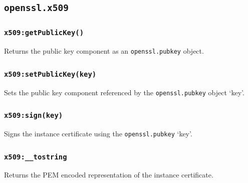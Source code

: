 \documentclass[11pt, oneside]{memoir}
\newcommand*{\fn}[1]{\texttt{#1}\xspace}
\newcommand*{\module}[1]{\texttt{#1}\xspace}
\newcounter{toccols}
\newenvironment{Module}[1]{
	\subsection{\texttt{#1}}
	\addtocontents{toc}{
		\protect\begin{multicols}{\value{toccols}}
	}
}{
	\addtocontents{toc}{\protect\end{multicols}}
}
\begin{document}
\begin{Module}{openssl.x509}
\subsubsection[\fn{x509:getPublicKey}]{\fn{x509:getPublicKey()}}

Returns the public key component as an \module{openssl.pubkey} object.

\subsubsection[\fn{x509:setPublicKey}]{\fn{x509:setPublicKey(key)}}

Sets the public key component referenced by the \module{openssl.pubkey} object `key'.

\subsubsection[\fn{x509:sign}]{\fn{x509:sign(key)}}

Signs the instance certificate using the \module{openssl.pubkey} `key'.

\subsubsection[\fn{x509:\_\_tostring}]{\fn{x509:\_\_tostring}}

Returns the PEM encoded representation of the instance certificate.

\end{Module}
\end{document}
